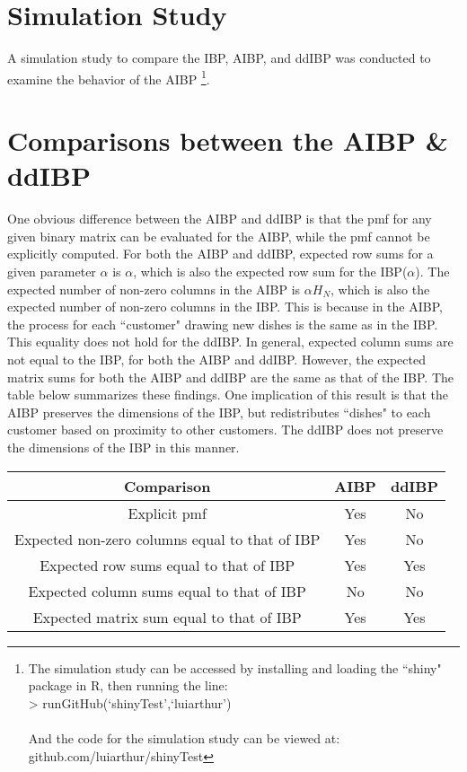 \section{Simulation Study}
A simulation study to compare the IBP, AIBP, and ddIBP was conducted to examine the
behavior of the AIBP \footnote{The simulation study can be accessed by installing 
and loading the ``shiny" package in R, then running the line: \\
> runGitHub(`shinyTest',`luiarthur')\\\\
And the code for the simulation study can be viewed at: \\
github.com/luiarthur/shinyTest}. 

\section{Comparisons between the AIBP \& ddIBP}
One obvious difference between the AIBP and ddIBP is that the pmf for any given 
binary matrix can be evaluated for the AIBP, while the pmf cannot be explicitly 
computed. For both the AIBP and ddIBP, expected row sums for a given parameter
$\alpha$ is $\alpha$, which is also the expected row sum for the IBP($\alpha$). 
The expected number of non-zero columns in the AIBP is $\alpha H_N$, which is also
the expected number of non-zero columns in the IBP. This is because in the AIBP,
the process for each ``customer" drawing new dishes is the same as in the IBP. This
equality does not hold for the ddIBP. In general, expected column sums are not
equal to the IBP, for both the AIBP and ddIBP. However, the expected matrix
sums for both the AIBP and ddIBP are the same as that of the IBP. The table below 
summarizes these findings. One implication of this result is that the AIBP 
preserves the dimensions of the IBP, but redistributes ``dishes" to each customer
based on proximity to other customers. The ddIBP does not preserve the dimensions
of the IBP in this manner. \\

\begin{center}
  \begin{tabular}{c|c|c}
    \hline
      Comparison & AIBP & ddIBP \\ \hline \hline
      Explicit pmf & Yes & No \\ \hline
      Expected non-zero columns equal to that of IBP & Yes & No \\ \hline
      Expected row sums equal to that of IBP & Yes & Yes \\ \hline
      Expected column sums equal to that of IBP & No & No \\ \hline
      Expected matrix sum equal to that of IBP & Yes & Yes \\ \hline
    \hline
  \end{tabular}
\end{center}

